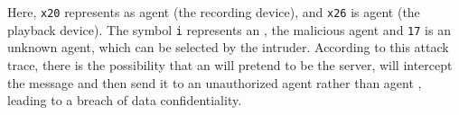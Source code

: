 \documentclass[conference]{IEEEtran}
\begin{document}
Here, \texttt{x20} represents as agent  (the recording device), and \texttt{x26} is agent  (the playback device).
The symbol \texttt{i} represents an , the malicious agent and \texttt{17} is an unknown agent, which can be selected by the intruder.
According to this attack trace, there is the possibility that an  will pretend to be the server, will intercept the message and then send it to an unauthorized agent rather than agent , leading to a breach of data confidentiality.
\end{document}
